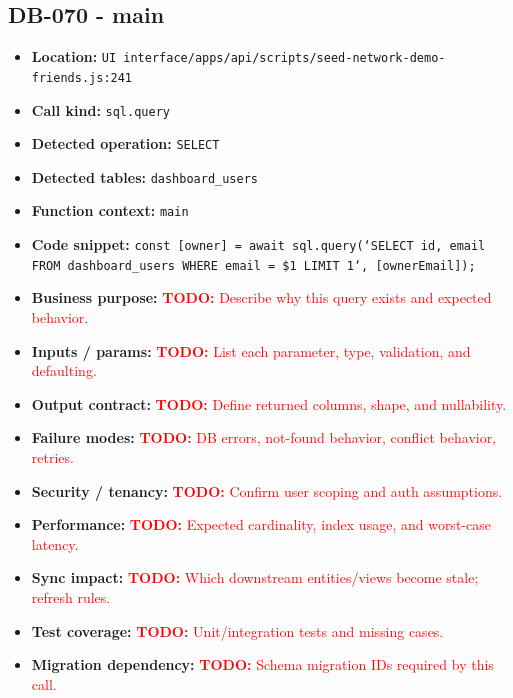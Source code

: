 \documentclass[11pt]{article}
\newcommand{\todoitem}[1]{\textcolor{red}{\textbf{TODO:} #1}}
\begin{document}
\subsection{DB-070 - main}
\begin{itemize}[leftmargin=1.5em]
\item \textbf{Location:} \texttt{UI interface/apps/api/scripts/seed-network-demo-friends.js:241}
\item \textbf{Call kind:} \texttt{sql.query}
\item \textbf{Detected operation:} \texttt{SELECT}
\item \textbf{Detected tables:} \texttt{dashboard\_users}
\item \textbf{Function context:} \texttt{main}
\item \textbf{Code snippet:} \texttt{const [owner] = await sql.query(`SELECT id, email FROM dashboard\_users WHERE email = \$1 LIMIT 1`, [ownerEmail]);}
\item \textbf{Business purpose:} \todoitem{Describe why this query exists and expected behavior.}
\item \textbf{Inputs / params:} \todoitem{List each parameter, type, validation, and defaulting.}
\item \textbf{Output contract:} \todoitem{Define returned columns, shape, and nullability.}
\item \textbf{Failure modes:} \todoitem{DB errors, not-found behavior, conflict behavior, retries.}
\item \textbf{Security / tenancy:} \todoitem{Confirm user scoping and auth assumptions.}
\item \textbf{Performance:} \todoitem{Expected cardinality, index usage, and worst-case latency.}
\item \textbf{Sync impact:} \todoitem{Which downstream entities/views become stale; refresh rules.}
\item \textbf{Test coverage:} \todoitem{Unit/integration tests and missing cases.}
\item \textbf{Migration dependency:} \todoitem{Schema migration IDs required by this call.}
\end{itemize}
\end{document}
